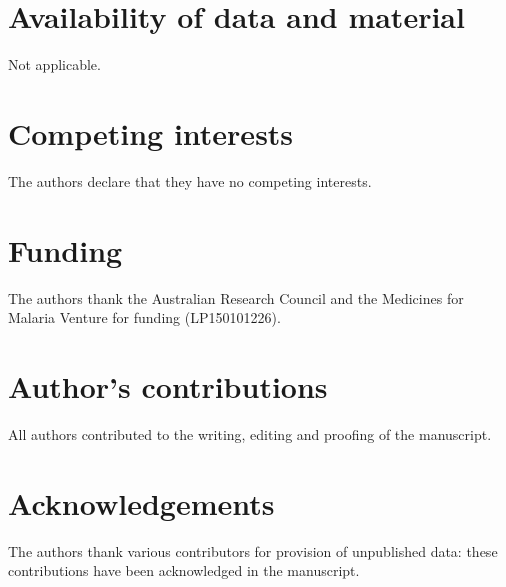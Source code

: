 \documentclass[twocolumn]{bmcart}%
\begin{document}
\begin{backmatter}
\section*{Availability of data and material}
Not applicable.

\section*{Competing interests}
The authors declare that they have no competing interests.

\section*{Funding}
The authors thank the Australian Research Council and the Medicines for Malaria Venture for funding (LP150101226).

\section*{Author's contributions}
All authors contributed to the writing, editing and proofing of the manuscript.

\section*{Acknowledgements}
 The authors thank various contributors for provision of unpublished data: these contributions have been acknowledged in the manuscript.



\end{backmatter}
\end{document}
